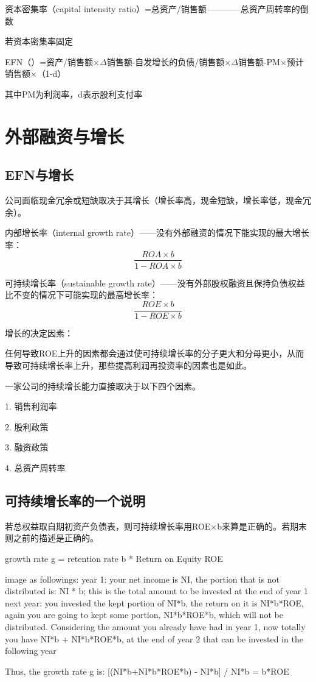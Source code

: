 \documentclass{article}
\begin{document}
资本密集率（capital intensity ratio）=总资产/销售额————总资产周转率的倒数

若资本密集率固定

EFN（）=资产/销售额×$ \Delta $销售额-自发增长的负债/销售额×$ \Delta $销售额-PM×预计销售额×（1-d）

其中PM为利润率，d表示股利支付率

\section{外部融资与增长}
\subsection{EFN与增长}
公司面临现金冗余或短缺取决于其增长（增长率高，现金短缺，增长率低，现金冗余）。

内部增长率（internal growth rate）——没有外部融资的情况下能实现的最大增长率：
\[
\frac{ROA\times b}{1-ROA\times b}
\]

可持续增长率（sustainable growth rate）——没有外部股权融资且保持负债权益比不变的情况下可能实现的最高增长率：
\[
\frac{ROE\times b}{1-ROE\times b}
\]

增长的决定因素：

任何导致ROE上升的因素都会通过使可持续增长率的分子更大和分母更小，从而导致可持续增长率上升，那些提高利润再投资率的因素也是如此。

一家公司的持续增长能力直接取决于以下四个因素。

1. 销售利润率

2. 股利政策

3. 融资政策

4. 总资产周转率

\subsection{可持续增长率的一个说明}
若总权益取自期初资产负债表，则可持续增长率用ROE×b来算是正确的。若期末则之前的描述是正确的。

growth rate g = retention rate b * Return on Equity ROE

image as followings:
year 1: your net income is NI, the portion that is not distributed is:  NI * b; this is the total amount to be invested at the end of year 1
next year: you invested the kept portion of NI*b, the return on it is NI*b*ROE, again you are going to kept some portion, NI*b*ROE*b, which will not be distributed. Considering the amount you already have had in year 1, now totally you have NI*b + NI*b*ROE*b, at the end of year 2 that can be invested in the following year

Thus, the growth rate g is: [(NI*b+NI*b*ROE*b) - NI*b] / NI*b =  b*ROE
\end{document}
